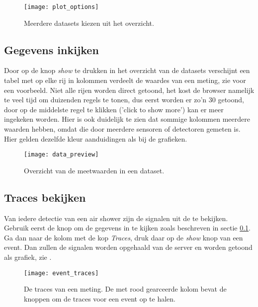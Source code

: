 \begin{figure}
    \centering
    \texttt{[image: plot\_options]}
    \caption{Meerdere datasets kiezen uit het overzicht.}
    \label{fig:plot_options}
\end{figure}


\subsection{Gegevens inkijken}\label{subsec:gegevens}

Door op de knop \emph{show} te drukken in het overzicht van de datasets
verschijnt een tabel met op elke rij in kolommen verdeelt de waardes van
een meting, zie  voor een voorbeeld. Niet alle
rijen worden direct getoond, het kost de browser namelijk te veel tijd
om duizenden regels te tonen, dus eerst worden er zo'n 30 getoond, door
op de middelste regel te klikken ('click to show more') kan er meer
ingekeken worden. Hier is ook duidelijk te zien dat sommige kolommen
meerdere waarden hebben, omdat die door meerdere sensoren of detectoren
gemeten is. Hier gelden dezelfde kleur aanduidingen als bij de grafieken.

\begin{figure}
    \centering
    \texttt{[image: data\_preview]}
    \caption{Overzicht van de meetwaarden in een dataset.}
    \label{fig:data_preview}
\end{figure}


\subsection{Traces bekijken}

Van iedere detectie van een air shower zijn de signalen uit de \pmts te
bekijken. Gebruik eerst de knop om de gegevens in te kijken zoals
beschreven in sectie \ref{subsec:gegevens}. Ga dan naar de kolom met de
kop \emph{Traces}, druk daar op de \emph{show} knop van een event. Dan
zullen de \pmt signalen worden opgehaald van de server en worden getoond
als grafiek, zie .

\begin{figure}
    \centering
    \texttt{[image: event\_traces]}
    \caption{De traces van een meting. De met rood gearceerde kolom
             bevat de knoppen om de traces voor een event op te halen.}
    \label{fig:event_traces}
\end{figure}




